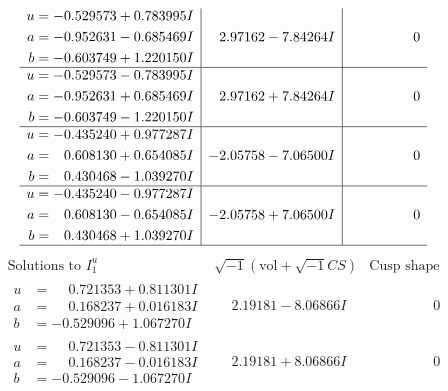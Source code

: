 \documentclass[1p]{elsarticle_modified}
\theoremstyle{definition}
\newcommand{\I}{\sqrt{-1}}
\begin{document}
$$\begin{array}{c|c|c}
\begin{aligned}
u &= -0.529573 + 0.783995 I \\
a &= -0.952631 - 0.685469 I \\
b &= -0.603749 + 1.220150 I\end{aligned}
 & \phantom{-}2.97162 - 7.84264 I & \phantom{-0.000000 } 0 \\ \hline\begin{aligned}
u &= -0.529573 - 0.783995 I \\
a &= -0.952631 + 0.685469 I \\
b &= -0.603749 - 1.220150 I\end{aligned}
 & \phantom{-}2.97162 + 7.84264 I & \phantom{-0.000000 } 0 \\ \hline\begin{aligned}
u &= -0.435240 + 0.977287 I \\
a &= \phantom{-}0.608130 + 0.654085 I \\
b &= \phantom{-}0.430468 - 1.039270 I\end{aligned}
 & -2.05758 - 7.06500 I & \phantom{-0.000000 } 0 \\ \hline\begin{aligned}
u &= -0.435240 - 0.977287 I \\
a &= \phantom{-}0.608130 - 0.654085 I \\
b &= \phantom{-}0.430468 + 1.039270 I\end{aligned}
 & -2.05758 + 7.06500 I & \phantom{-0.000000 } 0\\
 \hline 
 \end{array}$$\newpage$$\begin{array}{c|c|c}  
\text{Solutions to }I^u_{1}& \I (\text{vol} + \sqrt{-1}CS) & \text{Cusp shape}\\
 \hline 
\begin{aligned}
u &= \phantom{-}0.721353 + 0.811301 I \\
a &= \phantom{-}0.168237 + 0.016183 I \\
b &= -0.529096 + 1.067270 I\end{aligned}
 & \phantom{-}2.19181 - 8.06866 I & \phantom{-0.000000 } 0 \\ \hline\begin{aligned}
u &= \phantom{-}0.721353 - 0.811301 I \\
a &= \phantom{-}0.168237 - 0.016183 I \\
b &= -0.529096 - 1.067270 I\end{aligned}
 & \phantom{-}2.19181 + 8.06866 I & \phantom{-0.000000 } 0 \\ \hline\begin{aligned}

\end{aligned}
\end{array}$$
\end{document}

